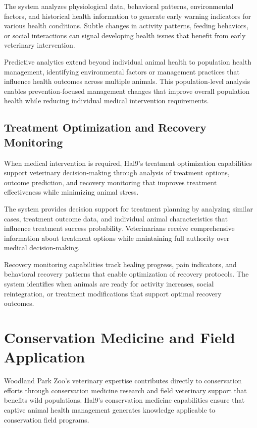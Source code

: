 \documentclass[
  Letterpaper,
]{scrbook}
\begin{document}
The system analyzes physiological data, behavioral patterns,
environmental factors, and historical health information to generate
early warning indicators for various health conditions. Subtle changes
in activity patterns, feeding behaviors, or social interactions can
signal developing health issues that benefit from early veterinary
intervention.

Predictive analytics extend beyond individual animal health to
population health management, identifying environmental factors or
management practices that influence health outcomes across multiple
animals. This population-level analysis enables prevention-focused
management changes that improve overall population health while reducing
individual medical intervention requirements.

\subsection{Treatment Optimization and Recovery
Monitoring}\label{treatment-optimization-and-recovery-monitoring}

When medical intervention is required, Hal9's treatment optimization
capabilities support veterinary decision-making through analysis of
treatment options, outcome prediction, and recovery monitoring that
improves treatment effectiveness while minimizing animal stress.

The system provides decision support for treatment planning by analyzing
similar cases, treatment outcome data, and individual animal
characteristics that influence treatment success probability.
Veterinarians receive comprehensive information about treatment options
while maintaining full authority over medical decision-making.

Recovery monitoring capabilities track healing progress, pain
indicators, and behavioral recovery patterns that enable optimization of
recovery protocols. The system identifies when animals are ready for
activity increases, social reintegration, or treatment modifications
that support optimal recovery outcomes.

\section{Conservation Medicine and Field
Application}\label{conservation-medicine-and-field-application}

Woodland Park Zoo's veterinary expertise contributes directly to
conservation efforts through conservation medicine research and field
veterinary support that benefits wild populations. Hal9's conservation
medicine capabilities ensure that captive animal health management
generates knowledge applicable to conservation field programs.
\end{document}
